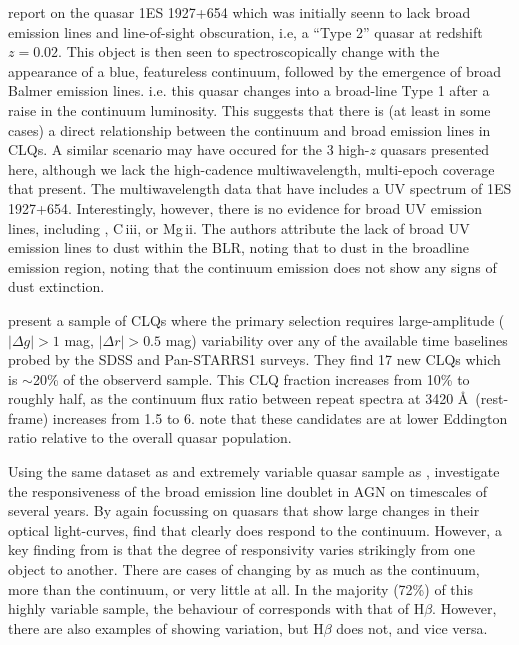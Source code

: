 \documentclass[fleqn,usenatbib]{mnras}
\begin{document}
\citet{Trakhtenbrot2019} report on the quasar 1ES 1927+654 which was
initially seenn to lack broad emission lines and line-of-sight
obscuration, i.e, a ``Type 2'' quasar at redshift $z=0.02$. This
object is then seen to spectroscopically change with the appearance of
a blue, featureless continuum, followed by the emergence of broad
Balmer emission lines.  i.e. this quasar changes into a broad-line
Type 1 after a raise in the continuum luminosity.  This suggests that
there is (at least in some cases) a direct relationship between the continuum
and broad emission lines in CLQs.  A similar scenario may have occured
for the 3 high-$z$ quasars presented here, although we lack the
high-cadence multiwavelength, multi-epoch coverage that
\citet{Trakhtenbrot2019} present.  The multiwavelength data that
\citet{Trakhtenbrot2019} have includes a UV spectrum of 1ES 1927+654.
Interestingly, however, there is no evidence for broad UV emission lines, including
\civ, C\,{\sc iii}, or Mg\,{\sc ii}.  The authors attribute the lack of broad UV
emission lines to dust within the BLR, noting that to dust in the
broadline emission region, noting that the continuum emission does not
show any signs of dust extinction.

\citet{MacLeod2019} present a sample of CLQs where the primary
selection requires large-amplitude ($| \Delta g | > 1$ mag, $| \Delta
r | > 0.5$ mag) variability over any of the available time baselines
probed by the SDSS and Pan-STARRS1 surveys. They find 17 new CLQs
which is $\sim$20\% of the observerd sample. This CLQ fraction
increases from 10\% to roughly half, as the continuum flux ratio
between repeat spectra at 3420 \AA\ (rest-frame) increases from 1.5 to
6. \citet{MacLeod2019} note that these candidates are at lower Eddington
ratio relative to the overall quasar population.

Using the same dataset as and extremely variable quasar sample
as \citet{MacLeod2019}, \citet{Homan2019}
investigate the responsiveness of the \mgii broad emission line
doublet in AGN on timescales of several years.  By again focussing on quasars that show large
changes in their optical light-curves, \citet{Homan2019} find that
\mgii clearly does respond to the continuum.  However, a key finding
from \citet{Homan2019} is that the degree of responsivity varies
strikingly from one object to another.  There are cases of \mgii
changing by as much as the continuum, more than the continuum, or very
little at all.  In the majority (72\%) of this highly variable sample,
the behaviour of \mgii corresponds with that of H$\beta$.  However,
there are also examples of \mgii showing variation, but H$\beta$ does
not, and vice versa.
\end{document}
